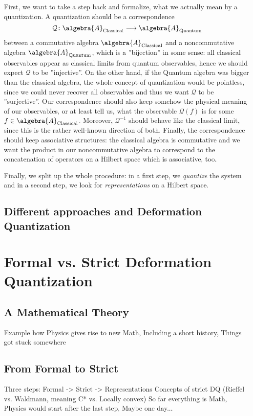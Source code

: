 First, we want to take a step back and formalize, what we actually mean by a quantization. A quantization should be a correspondence
\begin{equation*}
	\mathcal{Q}
	\colon
	\algebra{A}_{\mathrm{Classical}}
	\longrightarrow
	\algebra{A}_{\mathrm{Quantum}}
\end{equation*}
between a commutative algebra $\algebra{A}_{\mathrm{Classical}}$ and a noncommutative algebra $\algebra{A}_{\mathrm{Quantum}}$, which is a ''bijection'' in some sense: all classical observables appear as classical limits from quantum observables, hence we should expect $\mathcal{Q}$ to be ''injective''. On the other hand, if the Quantum algebra was bigger than the classical algebra, the whole concept of quantization would be pointless, since we could never recover all observables and thus we want $\mathcal{Q}$ to be ''surjective''. Our correspondence should also keep somehow the physical meaning of our observables, or at least tell us, what the observable $\mathcal{Q}(f)$ is for some $f \in \algebra{A}_{\mathrm{Classical}}$. Moreover, $\mathcal{Q}^{-1}$ should behave like the classical limit, since this is the rather well-known direction of both. Finally, the correspondence should keep associative structures: the classical algebra is commutative and we want the product in our noncommutative algebra to correspond to the concatenation of operators on a Hilbert space which is associative, too.

Finally, we split up the whole procedure: in a first step, we \emph{quantize} the system and in a second step, we look for \emph{representations} on a Hilbert space.


\subsection{Different approaches and Deformation Quantization}
\label{subsec:chap2_Deformation}



\section{Formal vs. Strict Deformation Quantization}
\label{sec:chap2_FormalStrict}

\subsection{A Mathematical Theory}
\label{subsec:chap2_MathTheory}
Example how Physics gives rise to new Math,
Including a short history,
Things got stuck somewhere


\subsection{From Formal to Strict}
\label{subsec:chap2_Formal2Strict}
Three steps: Formal -> Strict -> Representations
Concepts of strict DQ (Rieffel vs. Waldmann,
meaning C* vs. Locally convex)
So far everything is Math, Physics would start after the last step, Maybe one day...
